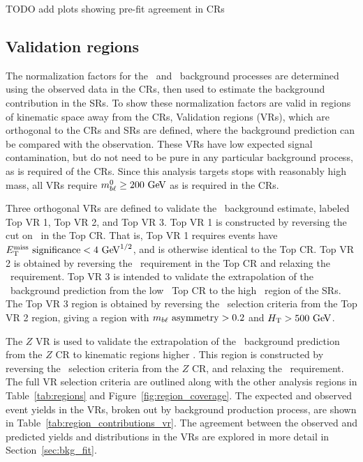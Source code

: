 {\color{red} TODO add plots showing pre-fit agreement in CRs}

\FloatBarrier
\subsection{Validation regions}
\label{sec:vr}

The normalization factors for the \TTBAR\ and \ZGAMMAJETS\ background processes
are determined using the observed data in the CRs, then used to estimate the
background contribution in the SRs.
To show these normalization factors are valid in regions of kinematic space away
from the CRs, Validation regions (VRs), which are orthogonal to the CRs and SRs
are defined, where the background prediction can be compared with the
observation.
These VRs have low expected signal contamination, but do not need to be pure in
any particular background process, as is required of the CRs.
Since this analysis targets stops with reasonably high mass, all VRs require
$\MBL^0 \geq 200 \GeV$ as is required in the CRs.

Three orthogonal VRs are defined to validate the \TTBAR\ background estimate,
labeled Top VR 1, Top VR 2, and Top VR 3.
Top VR 1 is constructed by reversing the cut on \METSIG\ in the Top CR.
That is, Top VR 1 requires events have $\METSIG < 4 \GeV^{1/2}$, and is
otherwise identical to the Top CR.
Top VR 2 is obtained by reversing the \MBLASYM\ requirement in the Top CR and
relaxing the \METSIG\ requirement.
Top VR 3 is intended to validate the extrapolation of the \TTBAR\ background
prediction from the low \HT\ Top CR to the high \HT\ region of the SRs.
The Top VR 3 region is obtained by reversing the \HT\ selection criteria from
the Top VR 2 region, giving a region with $m_{b\ell}~\mathrm{asymmetry} > 0.2$ and $\HT > 500 \GeV$.

The $Z$ VR is used to validate the extrapolation of the \ZGAMMAJETS\ background
prediction from the $Z$ CR to kinematic regions higher \HT.
This region is constructed by reversing the \HT\ selection criteria from the
$Z$ CR, and relaxing the \METSIG\ requirement.
The full VR selection criteria are outlined along with the other analysis
regions in Table~\ref{tab:regions} and Figure~\ref{fig:region_coverage}.
The expected and observed event yields in the VRs, broken out by background
production process, are shown in Table~\ref{tab:region_contributions_vr}.
The agreement between the observed and predicted yields and distributions in the
VRs are explored in more detail in Section~\ref{sec:bkg_fit}.

